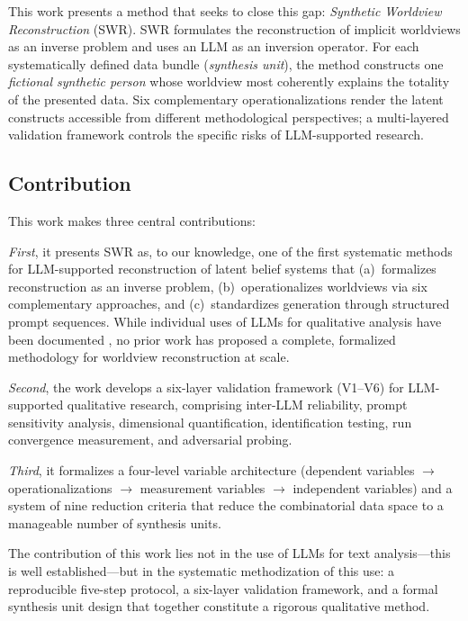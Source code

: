 \documentclass[11pt,a4paper]{article}
\theoremstyle{definition}
\theoremstyle{plain}
\theoremstyle{remark}
\begin{document}
This work presents a method that seeks to close this gap: \emph{Synthetic Worldview Reconstruction} (SWR). SWR formulates the reconstruction of implicit worldviews as an inverse problem and uses an LLM as an inversion operator. For each systematically defined data bundle (\emph{synthesis unit}), the method constructs one \emph{fictional synthetic person} whose worldview most coherently explains the totality of the presented data. Six complementary operationalizations render the latent constructs accessible from different methodological perspectives; a multi-layered validation framework controls the specific risks of LLM-supported research.

\subsection{Contribution}
\label{sec:contribution}

This work makes three central contributions:

\emph{First}, it presents SWR as, to our knowledge, one of the first systematic methods for LLM-supported reconstruction of latent belief systems that (a)~formalizes reconstruction as an inverse problem, (b)~operationalizes worldviews via six complementary approaches, and (c)~standardizes generation through structured prompt sequences. While individual uses of LLMs for qualitative analysis have been documented \citep{Tai2024, Barros2024}, no prior work has proposed a complete, formalized methodology for worldview reconstruction at scale.

\emph{Second}, the work develops a six-layer validation framework (V1--V6) for LLM-supported qualitative research, comprising inter-LLM reliability, prompt sensitivity analysis, dimensional quantification, identification testing, run convergence measurement, and adversarial probing.

\emph{Third}, it formalizes a four-level variable architecture (dependent variables $\rightarrow$ operationalizations $\rightarrow$ measurement variables $\rightarrow$ independent variables) and a system of nine reduction criteria that reduce the combinatorial data space to a manageable number of synthesis units.

The contribution of this work lies not in the use of LLMs for text analysis---this is well established---but in the systematic methodization of this use: a reproducible five-step protocol, a six-layer validation framework, and a formal synthesis unit design that together constitute a rigorous qualitative method.
\end{document}
